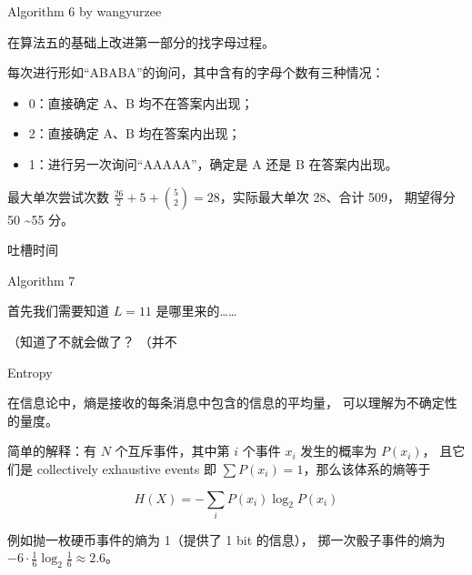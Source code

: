 \documentclass[UTF8]{beamer}
\begin{document}
\begin{frame}{Algorithm 6 by wangyurzee}

在算法五的基础上改进第一部分的找字母过程。

\pause 每次进行形如“ABABA”的询问，其中含有的字母个数有三种情况：
\begin{itemize}
    \item 0：直接确定 A、B 均不在答案内出现；
    \item 2：直接确定 A、B 均在答案内出现；
    \item 1：进行另一次询问“AAAAA”，确定是 A 还是 B 在答案内出现。
\end{itemize} 

\pause 最大单次尝试次数 $\frac{26}{2} + 5 + \binom{5}{2} = 28$，实际最大单次 28、合计 509，
期望得分 50 \textasciitilde 55 分。

\end{frame}

\begin{frame}{吐槽时间}
\end{frame}

\begin{frame}{Algorithm 7}

首先我们需要知道 $L = 11$ 是哪里来的……

\pause （知道了不就会做了？
\pause （并不

\end{frame}

\begin{frame}{Entropy}


在信息论中，熵是接收的每条消息中包含的信息的平均量，%
可以理解为不确定性的量度。

简单的解释：有 $N$ 个互斥事件，其中第 $i$ 个事件 $x_i$ 发生的概率为 $P(x_i)$，
且它们是 collectively exhaustive events 即 $\sum P(x_i) = 1$，那么该体系的熵等于

$$
    H(X) = -\sum_{i} P(x_i) \log_2 P(x_i)
$$

例如抛一枚硬币事件的熵为 1（提供了 1 bit 的信息），%
掷一次骰子事件的熵为 $-6 \cdot \frac{1}{6} \log_2 \frac{1}{6} \approx 2.6$。

\end{frame}
\end{document}
